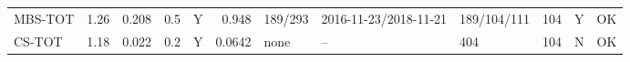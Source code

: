 \begin{longtable}{lrrrcrlllrcc}
MBS-TOT & 1.26 & 0.208 & 0.5 & Y & 0.948 & 189/293 & 2016-11-23/2018-11-21 & 189/104/111 & 104 & Y & OK\\
CS-TOT & 1.18 & 0.022 & 0.2 & Y & 0.0642 & none & -- & 404 & 104 & N & OK\\

\end{longtable}
